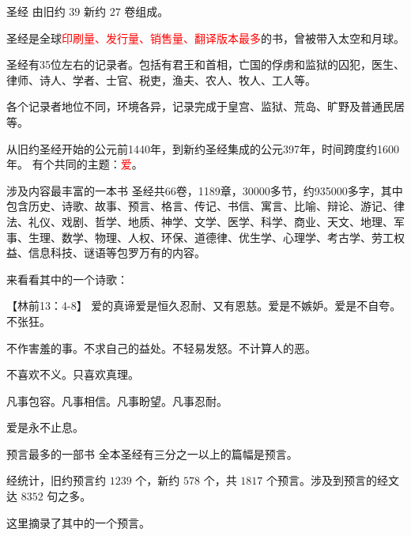 \documentclass[UTF8]{ctexbeamer}
\begin{document}
	\begin{frame}{圣经}
		由旧约 $39$ 新约 $27$ 卷组成。\par\pause
		圣经是全球\textcolor{red}{印刷量、发行量、销售量、翻译版本最多}的书，曾被带入太空和月球。\par\pause
		圣经有35位左右的记录者。包括有君王和首相，亡国的俘虏和监狱的囚犯，医生、律师、诗人、学者、士官、税吏，渔夫、农人、牧人、工人等。\par\pause
		各个记录者地位不同，环境各异，记录完成于皇宫、监狱、荒岛、旷野及普通民居等。\par\pause
		从旧约圣经开始的公元前1440年，到新约圣经集成的公元397年，时间跨度约1600年。 有个共同的主题：\textcolor{red}{爱}。
	\end{frame}
	\begin{frame}{涉及内容最丰富的一本书}
		圣经共66卷，1189章，30000多节，约935000多字，其中包含历史、诗歌、故事、预言、格言、传记、书信、寓言、比喻、辩论、游记、律法、礼仪、戏剧、哲学、地质、神学、文学、医学、科学、商业、天文、地理、军事、生理、数学、物理、人权、环保、道德律、优生学、心理学、考古学、劳工权益、信息科技、谜语等包罗万有的内容。\par\pause
		来看看其中的一个诗歌：
	\end{frame}
	\begin{frame}{【林前13：4-8】}
		爱的真谛爱是恒久忍耐、又有恩慈。爱是不嫉妒。爱是不自夸。不张狂。\par
		不作害羞的事。不求自己的益处。不轻易发怒。不计算人的恶。\par
		不喜欢不义。只喜欢真理。\par 
		凡事包容。凡事相信。凡事盼望。凡事忍耐。\par 
		爱是永不止息。
	\end{frame}
	\begin{frame}{预言最多的一部书}
		全本圣经有三分之一以上的篇幅是预言。\par \pause
		经统计，旧约预言约 $1239$ 个，新约 $578$ 个，共 $1817$ 个预言。涉及到预言的经文达 $8352$ 句之多。\par \pause
		这里摘录了其中的一个预言。
	\end{frame}
\end{document}
